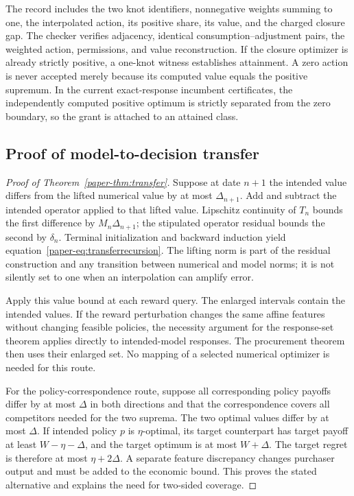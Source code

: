 The record includes the two knot identifiers, nonnegative weights summing to one, the interpolated action, its positive share, its value, and the charged closure gap. The checker verifies adjacency, identical consumption--adjustment pairs, the weighted action, permissions, and value reconstruction. If the closure optimizer is already strictly positive, a one-knot witness establishes attainment. A zero action is never accepted merely because its computed value equals the positive supremum. In the current exact-response incumbent certificates, the independently computed positive optimum is strictly separated from the zero boundary, so the grant is attached to an attained class.

\subsection{Proof of model-to-decision transfer}
\begin{proof}[Proof of Theorem~\ref{paper-thm:transfer}]
Suppose at date $n+1$ the intended value differs from the lifted numerical value by at most $\Delta_{n+1}$. Add and subtract the intended operator applied to that lifted value. Lipschitz continuity of $T_n$ bounds the first difference by $M_n\Delta_{n+1}$; the stipulated operator residual bounds the second by $\delta_n$. Terminal initialization and backward induction yield equation~\eqref{paper-eq:transferrecursion}. The lifting norm is part of the residual construction and any transition between numerical and model norms; it is not silently set to one when an interpolation can amplify error.

Apply this value bound at each reward query. The enlarged intervals contain the intended values. If the reward perturbation changes the same affine features without changing feasible policies, the necessity argument for the response-set theorem applies directly to intended-model responses. The procurement theorem then uses their enlarged set. No mapping of a selected numerical optimizer is needed for this route.

For the policy-correspondence route, suppose all corresponding policy payoffs differ by at most $\Delta$ in both directions and that the correspondence covers all competitors needed for the two suprema. The two optimal values differ by at most $\Delta$. If intended policy $p$ is $\eta$-optimal, its target counterpart has target payoff at least $W-\eta-\Delta$, and the target optimum is at most $W+\Delta$. The target regret is therefore at most $\eta+2\Delta$. A separate feature discrepancy changes purchaser output and must be added to the economic bound. This proves the stated alternative and explains the need for two-sided coverage.
\end{proof}

